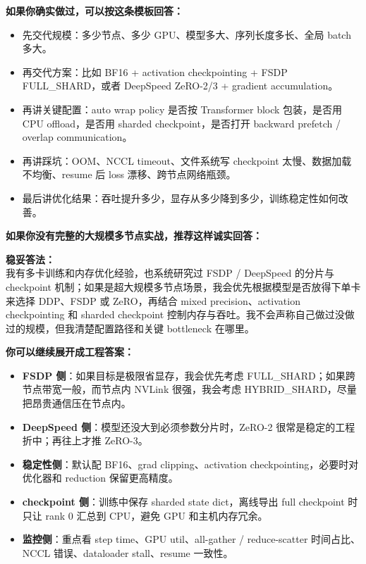 \textbf{如果你确实做过，可以按这条模板回答：}
\begin{itemize}[leftmargin=1.5em]
  \item 先交代规模：多少节点、多少 GPU、模型多大、序列长度多长、全局 batch 多大。
  \item 再交代方案：比如 BF16 + activation checkpointing + FSDP FULL\_SHARD，或者 DeepSpeed ZeRO-2/3 + gradient accumulation。
  \item 再讲关键配置：auto wrap policy 是否按 Transformer block 包装，是否用 CPU offload，是否用 sharded checkpoint，是否打开 backward prefetch / overlap communication。
  \item 再讲踩坑：OOM、NCCL timeout、文件系统写 checkpoint 太慢、数据加载不均衡、resume 后 loss 漂移、跨节点网络瓶颈。
  \item 最后讲优化结果：吞吐提升多少，显存从多少降到多少，训练稳定性如何改善。
\end{itemize}

\textbf{如果你没有完整的大规模多节点实战，推荐这样诚实回答：}
\begin{warnbox}
\textbf{稳妥答法：}\\
我有多卡训练和内存优化经验，也系统研究过 FSDP / DeepSpeed 的分片与 checkpoint 机制；如果是超大规模多节点场景，我会优先根据模型是否放得下单卡来选择 DDP、FSDP 或 ZeRO，再结合 mixed precision、activation checkpointing 和 sharded checkpoint 控制内存与吞吐。我不会声称自己做过没做过的规模，但我清楚配置路径和关键 bottleneck 在哪里。
\end{warnbox}

\textbf{你可以继续展开成工程答案：}
\begin{itemize}[leftmargin=1.5em]
  \item \textbf{FSDP 侧}：如果目标是极限省显存，我会优先考虑 FULL\_SHARD；如果跨节点带宽一般，而节点内 NVLink 很强，我会考虑 HYBRID\_SHARD，尽量把昂贵通信压在节点内。
  \item \textbf{DeepSpeed 侧}：模型还没大到必须参数分片时，ZeRO-2 很常是稳定的工程折中；再往上才推 ZeRO-3。
  \item \textbf{稳定性侧}：默认配 BF16、grad clipping、activation checkpointing，必要时对优化器和 reduction 保留更高精度。
  \item \textbf{checkpoint 侧}：训练中保存 sharded state dict，离线导出 full checkpoint 时只让 rank 0 汇总到 CPU，避免 GPU 和主机内存冗余。
  \item \textbf{监控侧}：重点看 step time、GPU util、all-gather / reduce-scatter 时间占比、NCCL 错误、dataloader stall、resume 一致性。
\end{itemize}

